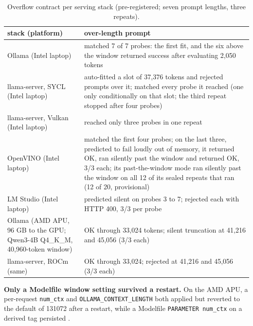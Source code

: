 \documentclass[conference,10pt]{IEEEtran}
\begin{document}
\begin{table}[t]
\caption{Overflow contract per serving stack (pre-registered; seven prompt lengths, three repeats).}
\label{tab:contract}
\centering\footnotesize
\begin{tabular}{@{}>{\raggedright\arraybackslash}p{}>{\raggedright\arraybackslash}p{}@{}}
\toprule
stack (platform) & over-length prompt \\
\midrule
Ollama (Intel laptop) & matched 7 of 7 probes: the first fit, and the six above the window returned success after evaluating 2,050 tokens  \\
llama-server, SYCL (Intel laptop) & auto-fitted a slot of 37,376 tokens and rejected prompts over it; matched every probe it reached (one only conditionally on that slot; the third repeat stopped after four probes)  \\
llama-server, Vulkan (Intel laptop) & reached only three probes in one repeat  \\
OpenVINO (Intel laptop) & matched the first four probes; on the last three, predicted to fail loudly out of memory, it returned OK, ran silently past the window and returned OK, 3/3 each; its past-the-window mode ran silently past the window on all 12 of its sealed repeats that ran (12 of 20, provisional)  \\
LM Studio (Intel laptop) & predicted silent on probes 3 to 7; rejected each with HTTP 400, 3/3 per probe  \\
Ollama (AMD APU, 96 GB to the GPU; Qwen3-4B Q4\_K\_M, 40,960-token window) & OK through 33,024 tokens; silent truncation at 41,216 and 45,056 (3/3 each)  \\
llama-server, ROCm (same) & OK through 33,024; rejected at 41,216 and 45,056 (3/3 each)  \\
\bottomrule
\end{tabular}
\end{table}

\textbf{Only a Modelfile window setting survived a restart.} On the AMD APU, a per-request \texttt{num\_ctx} and \texttt{OLLAMA\_CONTEXT\_LENGTH} both applied but reverted to the default of 131072 after a restart, while a Modelfile \texttt{PARAMETER num\_ctx} on a derived tag persisted%
.
\end{document}
